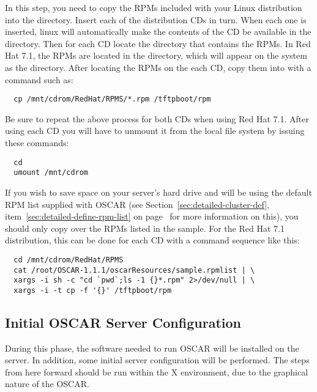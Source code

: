 In this step, you need to copy the RPMs included with your Linux
distribution into the  directory. 
\begchange
Insert each of the distribution CDs in turn.
When each one is inserted, linux will automatically make the
contents of the CD be available in the  directory.
Then for each CD locate the directory that contains the RPMs.
In Red Hat 7.1, the RPMs are located in the 
directory, which will appear on the system as the 
 directory. 
\endchange
 After locating the RPMs on the each CD, copy them into
 with a command such as:

\begin{verbatim}
  cp /mnt/cdrom/RedHat/RPMS/*.rpm /tftpboot/rpm
\end{verbatim}
  
Be sure to repeat the above process for both CDs when using Red Hat
7.1.
\begchange
After using each CD you will have to unmount it from the local
file system by issuing these commands:

\begin{verbatim}
  cd
  umount /mnt/cdrom
\end{verbatim}
\endchange
If you wish to save space on your server's hard drive and will be
using the default RPM list supplied with OSCAR (see
Section~\ref{sec:detailed-cluster-def},
item~\ref{sec:detailed-define-rpm-list} on
page~\pageref{sec:detailed-define-rpm-list} for more information on
this), you should only copy over the RPMs listed in the sample.
\begchange
For the Red Hat 7.1 distribution, this can be done for each CD with
a command sequence like this:

\begin{verbatim}
  cd /mnt/cdrom/RedHat/RPMS
  cat /root/OSCAR-1.1.1/oscarResources/sample.rpmlist | \
  xargs -i sh -c "cd `pwd`;ls -1 {}*.rpm" 2>/dev/null | \
  xargs -i -t cp -f '{}' /tftpboot/rpm
\end{verbatim}

\endchange

  
\subsection{Initial OSCAR Server Configuration}

During this phase, the software needed to run OSCAR will be installed
on the server. In addition, some initial server configuration will be
performed. The steps from here forward should be run within the X
environment, due to the graphical nature of the OSCAR.

